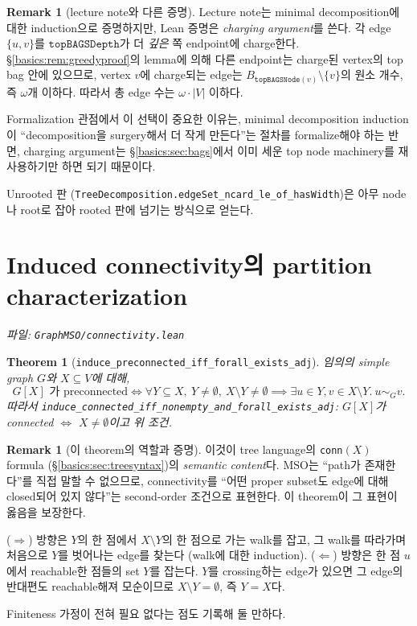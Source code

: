 \documentclass[11pt]{article}
\theoremstyle{definition}
\newtheorem{remark}[definition]{Remark}
\theoremstyle{plain}
\newtheorem{theorem}[definition]{Theorem}
\newcommand{\MSO}{\mathrm{MSO}}
\newcommand{\lean}[1]{\texttt{#1}}
\newcommand{\leanfile}[1]{\texttt{#1}}
\begin{document}
\begin{remark}[lecture note와 다른 증명]
\label{basics:rem:edgeboundproof}
Lecture note는 minimal decomposition에 대한 induction으로 증명하지만, Lean
증명은 \emph{charging argument}를 쓴다. 각 edge $\{u,v\}$를
$\lean{topBAGSDepth}$가 더 \emph{깊은} 쪽 endpoint에 charge한다.
\S\ref{basics:rem:greedyproof}의 lemma에 의해 다른 endpoint는 charge된
vertex의 top bag 안에 있으므로, vertex $v$에 charge되는 edge는
$B_{\lean{topBAGSNode}(v)} \setminus \{v\}$의 원소 개수, 즉 $\omega$개
이하다. 따라서 총 edge 수는 $\omega \cdot |V|$ 이하다.

Formalization 관점에서 이 선택이 중요한 이유는, minimal decomposition induction이
``decomposition을 surgery해서 더 작게 만든다''는 절차를 formalize해야 하는
반면, charging argument는 \S\ref{basics:sec:bags}에서 이미 세운 top node
machinery를 재사용하기만 하면 되기 때문이다.
\end{remark}

Unrooted 판 (\lean{TreeDecomposition.edgeSet\_ncard\_le\_of\_hasWidth})은 아무
node나 root로 잡아 rooted 판에 넘기는 방식으로 얻는다.

\section{Induced connectivity의 partition characterization}
\label{basics:sec:conn}

\emph{파일: \leanfile{GraphMSO/connectivity.lean}}

\begin{theorem}[\lean{induce\_preconnected\_iff\_forall\_exists\_adj}]
\label{basics:thm:connpartition}
임의의 simple graph $G$와 $X \subseteq V$에 대해,
\[
  G[X] \text{ 가 preconnected} \iff
  \forall Y \subseteq X,\ Y \ne \emptyset,\ X \setminus Y \ne \emptyset
  \implies \exists u \in Y, v \in X \setminus Y.\ u \sim_G v.
\]
따라서 \lean{induce\_connected\_iff\_nonempty\_and\_forall\_exists\_adj}:
$G[X]$가 connected $\iff$ $X \ne \emptyset$이고 위 조건.
\end{theorem}

\begin{remark}[이 theorem의 역할과 증명]
이것이 tree language의 \lean{conn}$(X)$ formula
(\S\ref{basics:sec:treesyntax})의 \emph{semantic content}다. $\MSO$는
``path가 존재한다''를 직접 말할 수 없으므로, connectivity를 ``어떤 proper
subset도 edge에 대해 closed되어 있지 않다''는 second-order 조건으로 표현한다.
이 theorem이 그 표현이 옳음을 보장한다.

($\Rightarrow$) 방향은 $Y$의 한 점에서 $X \setminus Y$의 한 점으로 가는 walk를
잡고, 그 walk를 따라가며 처음으로 $Y$를 벗어나는 edge를 찾는다 (walk에 대한
induction). ($\Leftarrow$) 방향은 한 점 $u$에서 reachable한 점들의 set $Y$를
잡는다. $Y$를 crossing하는 edge가 있으면 그 edge의 반대편도 reachable해져
모순이므로 $X \setminus Y = \emptyset$, 즉 $Y = X$다.

Finiteness 가정이 전혀 필요 없다는 점도 기록해 둘 만하다.
\end{remark}
\end{document}
